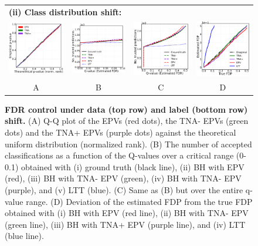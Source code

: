\documentclass{article}
\begin{document}
\begin{figure}[h!]
\begin{tabular}{cccc}
		\multicolumn{4}{l}{\bf (ii) Class distribution shift:}\\
		\includegraphics[width=0.225\linewidth, height=0.225\linewidth]{img/cnn_QQ_balanced.png}&
		\includegraphics[width=0.225\linewidth, height=0.225\linewidth]{img/cnn_balanced_fdr_control_loc.png} &
		\includegraphics[width=0.225\linewidth, height=0.225\linewidth]{img/cnn_balanced_fdr_control.png} & 
		\includegraphics[width=0.225\linewidth, height=0.225\linewidth]{img/cnn_FDPscat_balanced.png} \\		
		A & B & C & D \\
	\end{tabular}
\caption{{\bf  FDR control under data (top row) and label (bottom row) shift.}
	(A) Q-Q plot of the EPVs (red dots), the TNA- EPVs (green dots) and the TNA+ EPVs (purple dots) against the theoretical uniform distribution (normalized rank). (B) The number of accepted classifications as a function of the Q-values over a critical range (0-0.1) obtained with (i) ground truth (black line), (ii) BH with EPV (red), (iii) BH with TNA- EPV (green), (iv) BH with TNA- EPV (purple), and (v) LTT (blue). (C) Same as (B) but over the entire q-value range. (D) Deviation of the estimated FDP from the true FDP obtained with (i) BH with EPV (red line), (ii) BH with TNA- EPV  (green line),  (iii) BH with TNA+ EPV  (purple line), and (iv) LTT (blue line).}
	\label{fig:mnist_shfit}
\end{figure}
\end{document}
